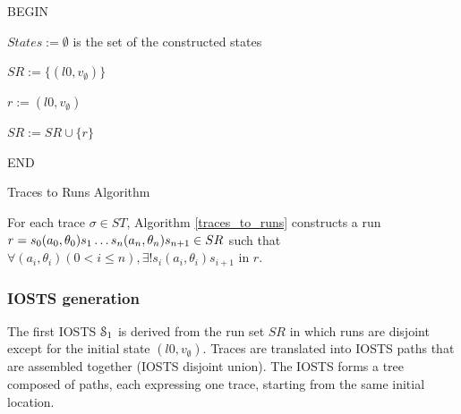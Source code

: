 \begin{algorithm}
 


BEGIN\;

$States:=\emptyset$ is the set of the constructed states\;

 {
$SR:= \{(l0,v_\emptyset)\}$}

 {
$r:= (l0,v_\emptyset)$\;


$SR:=SR \cup \{r\}$

}%

END\;

    \caption{Traces to Runs Algorithm}
    \label{traces_to_runs}
\end{algorithm}

\begin{proposition}
For each trace $\sigma \in ST$, Algorithm \ref{traces_to_runs}
constructs a run $r=s_0(a_0,\theta_0)s_1 \dots
\\s_n(a_n,\theta_n)s_{n+1} \in SR$ such that $\forall
(a_i,\theta_i) ( 0<i\leq n), \exists ! s_i(a_i,\theta_i)s_{i+1}$
in $r$.
\end{proposition}


\subsubsection{IOSTS generation}
\label{sec:iosts-gen}

The first IOSTS $\EuScript{S}_1$ is derived from the run set $SR$
in which runs are disjoint except for the initial state
$(l0,v_\emptyset)$. Traces are translated into IOSTS paths that
are assembled together (IOSTS disjoint union). The IOSTS forms a
tree composed of paths, each expressing one trace, starting from
the same initial location.

